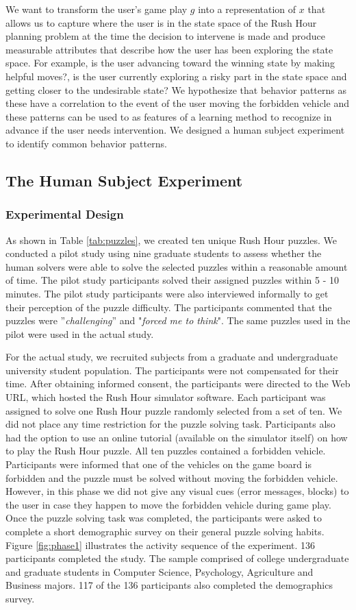We want to transform the user's game play $g$ into a representation of $x$ that allows us to capture where the user is in the state space of the Rush Hour planning problem at the time the decision to intervene is made and  produce measurable attributes that describe how the user has been exploring the state space. For example, is the user advancing toward the winning state by making helpful moves?, is the user currently exploring a risky part in the state space and getting closer to the undesirable state? We hypothesize that behavior patterns as these have a correlation to the event of the user moving the forbidden vehicle and these patterns can be used to as features of a learning method to recognize in advance if the user needs intervention. We designed a human subject experiment to identify common behavior patterns.

\subsection*{The Human Subject Experiment}
\subsubsection*{Experimental Design}
As shown in Table \ref{tab:puzzles}, we created ten unique Rush Hour puzzles. We conducted a pilot study using nine graduate students to assess whether the human solvers were able to solve the selected puzzles within a reasonable amount of time. The pilot study participants solved their assigned puzzles within 5 - 10 minutes. The pilot study participants were also interviewed informally to get their perception of the puzzle difficulty. The participants commented that the puzzles were ''\textit{challenging}'' and "\textit{forced me to think}". The same puzzles used in the pilot were used in the actual study.

For the actual study, we recruited subjects from a graduate and undergraduate university student population. The participants were not compensated for their time. After obtaining informed consent, the participants were directed to the Web URL, which hosted the Rush Hour simulator software. Each participant was assigned to solve one Rush Hour puzzle randomly selected from a set of ten. We did not place any time restriction for the puzzle solving task. Participants also had the option to use an online tutorial (available on the simulator itself) on how to play the Rush Hour puzzle. All ten puzzles contained a forbidden vehicle. Participants were informed that one of the vehicles on the game board is forbidden and the puzzle must be solved without moving the forbidden vehicle. However, in this phase we did not give any visual cues (error messages, blocks) to the user in case they happen to move the forbidden vehicle during game play. Once the puzzle solving task was completed, the participants were asked to complete a short demographic survey on their general puzzle solving habits. Figure \ref{fig:phase1} illustrates the activity sequence of the experiment. 136 participants completed the study. The sample comprised of college undergraduate and graduate students in Computer Science, Psychology, Agriculture and Business majors. 117 of the 136 participants also completed the demographics survey.

